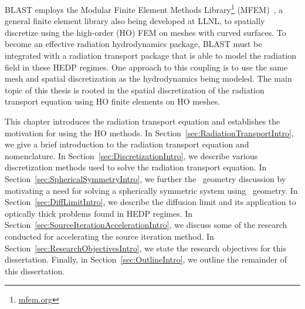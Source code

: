 \documentclass[12pt,letterpaper]{article}
\begin{document}
BLAST employs the Modular Finite Element Methods Library\footnote{\url{mfem.org}} (MFEM)~\cite{MFEM_Web}, a general finite element library also being developed at LLNL, to spatially discretize using the high-order (HO) FEM on meshes with curved surfaces. To  become an effective radiation hydrodynamics package, BLAST must be integrated with a radiation transport package that is able to model the radiation field in these HEDP regimes. One approach to this coupling is to use the same mesh and spatial discretization as the hydrodynamics being modeled. The main topic of this thesis is rooted in the spatial discretization of the radiation transport equation using HO finite elements on HO meshes.

This chapter introduces the radiation transport equation and establishes the motivation for using the HO methods. In Section~\ref{sec:RadiationTransportIntro}, we give a brief introduction to the radiation transport equation and nomenclature. In Section~\ref{sec:DiscretizationIntro}, we describe various discretization methods used to solve the radiation transport equation.
In Section~\ref{sec:SphericalSymmetryIntro}, we further the \RZ\ geometry discussion by motivating a need for solving a spherically symmetric system using \RZ\ geometry. In Section~\ref{sec:DiffLimitIntro}, we describe the diffusion limit and its application to optically thick problems found in HEDP regimes.  In Section~\ref{sec:SourceIterationAccelerationIntro}, we discuss some of the research conducted for accelerating the source iteration method. In Section~\ref{sec:ResearchObjectivesIntro}, we state the research objectives for this dissertation. Finally, in Section~\ref{sec:OutlineIntro}, we outline the remainder of this dissertation.

\end{document}
